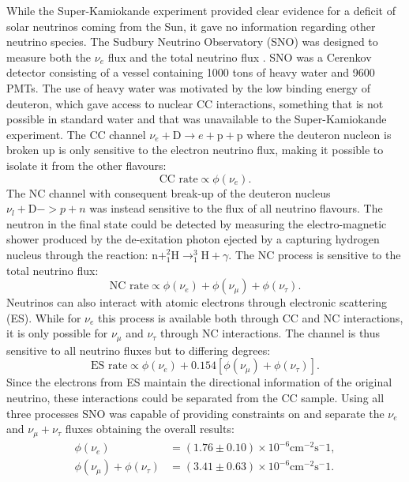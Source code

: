 While the Super-Kamiokande experiment provided clear evidence for a deficit of solar neutrinos coming from the Sun, it gave no information regarding other neutrino species. The Sudbury Neutrino Observatory (SNO) was designed to measure both the $\nu_e$ flux and the total neutrino flux \cite{SNO:2002tuh}. SNO was a Cerenkov detector consisting of a vessel containing 1000 tons of heavy water and 9600 PMTs. The use of heavy water was motivated by the low binding energy of deuteron, which gave access to nuclear CC interactions, something that is not possible in standard water and that was unavailable to the Super-Kamiokande experiment. The CC channel $\nu_e+\text{D}\rightarrow e+ \text{p}+ \text{p}$ where the deuteron nucleon is broken up is only sensitive to the electron neutrino flux, making it possible to isolate it from the other flavours:
\begin{equation}
    \text{CC rate}\propto \phi(\nu_e) .
\end{equation}
The NC channel with consequent break-up of the deuteron nucleus $\nu_l+\text{D}->p+n$ was instead sensitive to the flux of all neutrino flavours. The neutron in the final state could be detected by measuring the electro-magnetic shower produced by the de-exitation photon ejected by a capturing hydrogen nucleus through the reaction: $\text{n}+^2_1\text{H} \rightarrow ^3_1\text{H}+\gamma$. The NC process is sensitive to the total neutrino flux:
\begin{equation}
    \text{NC rate}\propto \phi(\nu_e)+\phi(\nu_\mu)+\phi(\nu_\tau) .
\end{equation}
Neutrinos can also interact with atomic electrons through electronic scattering (ES). While for $\nu_e$ this process is available both through CC and NC interactions, it is only possible for $\nu_\mu$ and $\nu_\tau$ through NC interactions. The channel is thus sensitive to all neutrino fluxes but to differing degrees:
\begin{equation}
    \text{ES rate}\propto\phi(\nu_e)+0.154\left[\phi(\nu_\mu)+\phi(\nu_\tau)\right] .
\end{equation}
Since the electrons from ES maintain the directional information of the original neutrino, these interactions could be separated from the CC sample. Using all three processes SNO was capable of providing constraints on and separate the $\nu_e$ and $\nu_\mu+\nu_\tau$ fluxes obtaining the overall results:
\begin{equation}
    \begin{aligned}
        \phi(\nu_e)&=(1.76\pm0.10)\times 10^{-6} \text{cm}^{-2}\text{s}^-1 , \\
        \phi(\nu_\mu)+\phi(\nu_\tau)&=(3.41\pm0.63)\times 10^{-6} \text{cm}^{-2}\text{s}^-1 .
    \end{aligned}
\end{equation}
